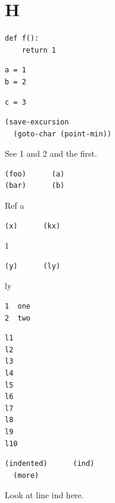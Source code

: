 \documentclass[11pt]{article}
\author{root}
\date{\today}
\title{}
\begin{document}
\tableofcontents

\section{H}
\label{sec:orgc8fa02f}
\begin{verbatim}
def f():
    return 1
\end{verbatim}

\begin{verbatim}
a = 1
b = 2
\end{verbatim}

\begin{verbatim}
c = 3
\end{verbatim}

\begin{verbatim}
(save-excursion
  (goto-char (point-min))
\end{verbatim}
See 1 and 2 and the first.

\begin{verbatim}
(foo)      (a)
(bar)      (b)
\end{verbatim}
Ref a

\begin{verbatim}
(x)      (kx)
\end{verbatim}
1

\begin{verbatim}
(y)      (ly)
\end{verbatim}
ly

\begin{verbatim}
1  one
2  two
\end{verbatim}

\begin{verbatim}
l1
l2
l3
l4
l5
l6
l7
l8
l9
l10
\end{verbatim}

\begin{verbatim}
(indented)      (ind)
  (more)
\end{verbatim}
Look at line ind here.
\end{document}
